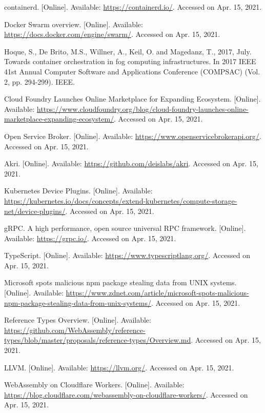 \documentclass{ieeeaccess}
\begin{document}
\begin{thebibliography}{00}
 containerd. [Online]. Available: \url{https://containerd.io/}. Accessed on Apr. 15, 2021.

 Docker Swarm overview. [Online]. Available: \url{https://docs.docker.com/engine/swarm/}. Accessed on Apr. 15, 2021.

 Hoque, S., De Brito, M.S., Willner, A., Keil, O. and Magedanz, T., 2017, July. Towards container orchestration in fog computing infrastructures. In 2017 IEEE 41st Annual Computer Software and Applications Conference (COMPSAC) (Vol. 2, pp. 294-299). IEEE.

 Cloud Foundry Launches Online Marketplace for Expanding Ecosystem. [Online]. Available: \url{https://www.cloudfoundry.org/blog/cloud-foundry-launches-online-marketplace-expanding-ecosystem/}. Accessed on Apr. 15, 2021.

 Open Service Broker. [Online]. Available: \url{https://www.openservicebrokerapi.org/}. Accessed on Apr. 15, 2021.

 Akri. [Online]. Available: \url{https://github.com/deislabs/akri}. Accessed on Apr. 15, 2021.

 Kubernetes Device Plugins. [Online]. Available: \url{https://kubernetes.io/docs/concepts/extend-kubernetes/compute-storage-net/device-plugins/}. Accessed on Apr. 15, 2021.

 gRPC. A high performance, open source universal RPC framework. [Online]. Available: \url{https://grpc.io/}. Accessed on Apr. 15, 2021.

 TypeScript. [Online]. Available: \url{https://www.typescriptlang.org/}. Accessed on Apr. 15, 2021.

 Microsoft spots malicious npm package stealing data from UNIX systems. [Online]. Available: \url{https://www.zdnet.com/article/microsoft-spots-malicious-npm-package-stealing-data-from-unix-systems/}. Accessed on Apr. 15, 2021.

 Reference Types Overview. [Online]. Available: \url{https://github.com/WebAssembly/reference-types/blob/master/proposals/reference-types/Overview.md}. Accessed on Apr. 15, 2021.

 LLVM. [Online]. Available: \url{https://llvm.org/}. Accessed on Apr. 15, 2021.

 WebAssembly on Cloudflare Workers. [Online]. Available: \url{https://blog.cloudflare.com/webassembly-on-cloudflare-workers/}. Accessed on Apr. 15, 2021.


\end{thebibliography}
\end{document}
